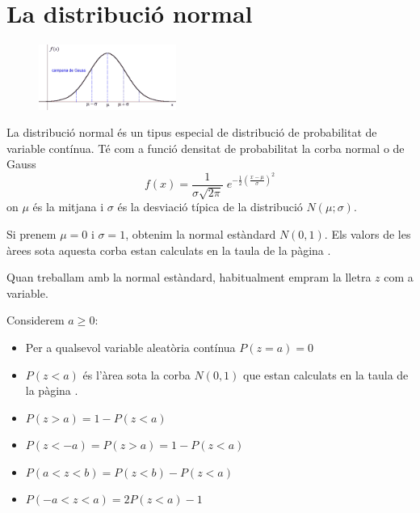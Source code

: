 \vspace{2cm}
\section{La distribució normal}

\begin{theorybox}
		\begin{figure} 
		\vspace{-0.25cm}
		\begin{center}
			\includegraphics[width=0.4\textwidth]{img-12/campana_gauss1}
		\end{center}
		
	\end{figure}

	La distribució normal és un tipus especial de distribució de probabilitat de variable contínua. Té com a funció densitat de probabilitat la corba normal o de Gauss
	\begin{equation*}
			f(x)=\frac{1}{\sigma\sqrt{2\pi}}\; e^{ - \frac{1}{2} \left(\frac{x-\mu}{\sigma}\right)^2} 
	\end{equation*}
	on $\mu$ és la mitjana i $\sigma$ és la desviació típica de la distribució $N(\mu; \sigma)$.
	
	Si prenem $\mu=0$ i $\sigma=1$, obtenim la normal estàndard $N(0,1)$. Els valors de les àrees sota aquesta corba estan calculats en la taula de la pàgina \pageref{tab:normal01}. 
\end{theorybox}

\begin{theorybox}
	Quan treballam amb la normal estàndard, habitualment empram la lletra $z$ com a variable. 
	
	Considerem $a\geq 0$:
	
	\begin{itemize}
		\item Per a qualsevol variable aleatòria contínua $P(z=a)=0$
		\item $P(z<a)$ és l'àrea sota la corba $N(0,1)$ que estan calculats en la taula de la pàgina \pageref{tab:normal01}. 
		\item $P(z>a)=1-P(z<a)$
		\item $P(z<-a)=P(z>a)=1-P(z<a)$
		\item $P(a<z<b)=P(z<b)-P(z<a)$
		\item $P(-a<z<a)=2P(z<a)-1$
	\end{itemize}	
	
	
	  
	  
\end{theorybox}


